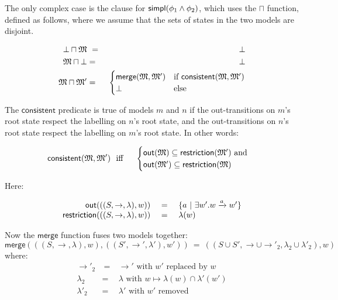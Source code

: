 \NI The only complex case is the clause for $\mathsf{simpl}(\phi_1 \land \phi_2)$,
which uses the $\sqcap$ function, defined as follows, where we assume
that the sets of states in the two models are disjoint.

\begin{eqnarray*}
  \bot \sqcap \MMM  &\ =\ &  \bot  \\
  \MMM \sqcap \bot      & = &  \bot  
     \\
  \MMM \sqcap \MMM'
     & = & 
  \begin{cases}
    \mathsf{merge}(\MMM, \MMM') & \text{if}\ \mathsf{consistent}(\MMM, \MMM') \\
    \bot & \text{else}
  \end{cases}
\end{eqnarray*}

\NI The $\mathsf{consistent}$ predicate is true of models $m$ and $n$ if
the out-transitions on $m$'s root state respect the labelling on $n$'s
root state, and the out-transitions on $n$'s root state respect the
labelling on $m$'s root state. In other words:

\begin{eqnarray*}
  \mathsf{consistent}(\frak{M}, \frak{M}') 
     &\ \mbox{ iff }\ & 
  \begin{cases}
    \mathsf{out}(\frak{M}) \subseteq \mathsf{restriction}(\frak{M}') \mbox{ and}  \\
    \mathsf{out}(\frak{M}') \subseteq \mathsf{restriction}(\frak{M}) 
  \end{cases}
\end{eqnarray*}

\NI Here:

\[
\begin{array}{rcl}
  \mathsf{out}(((S,\rightarrow,\lambda),w)) 
     &\ =\ & \{ a \ | \  \exists w' . w \xrightarrow{a} w'\}  \\
  \mathsf{restriction}(((S,\rightarrow,\lambda),w)) 
    & = & 
  \lambda(w) 
\end{array}
\]

\NI Now the $\mathsf{merge}$ function fuses two  models together:
\[
   \mathsf{merge}( ( (S, \rightarrow, \lambda), w),  ( (S', \rightarrow', \lambda'), w')) 
      \ =\ 
   ((S \cup S', \rightarrow \cup \rightarrow'_2, \lambda_2 \cup \lambda'_2), w)
\]
where:
\begin{eqnarray*}
  \rightarrow'_2 &\ =\ & \rightarrow' \mbox{ with } w' \mbox{ replaced by } w  \\
  \lambda_2 & = & \lambda \mbox{ with } w \mapsto \lambda(w) \cap \lambda'(w')  \\
  \lambda'_2 & = & \lambda' \mbox{ with } w' \mbox{ removed } 
\end{eqnarray*}

